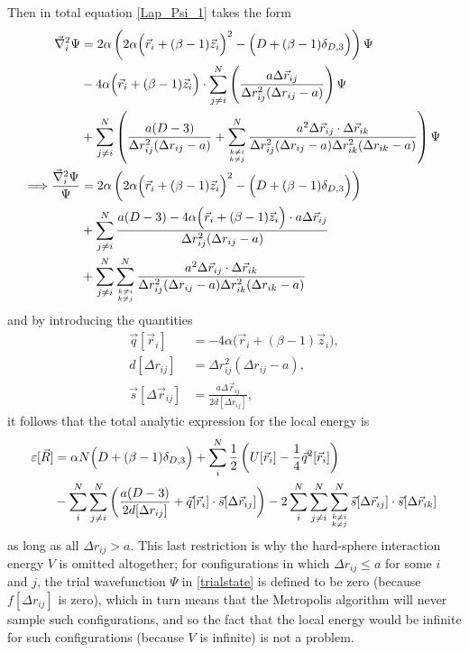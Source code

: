 \documentclass[a4paper,8pt]{article}
\begin{document}
Then in total equation \eqref{Lap_Psi_1} takes the form
\begin{align}
\vec{\nabla}_i^2\Psi &= 2\alpha\left(2\alpha\Big(\vec{r}_i+(\beta-1)\vec{z}_i\Big)^2-\Big(D+(\beta-1)\delta_{D,3}\Big)\right) \Psi \nonumber\\
&- 4\alpha\Big(\vec{r}_i+(\beta-1)\vec{z}_i\Big) \cdot \sum\limits_{j \neq i}^N \left(\frac{a\Delta\vec{r}_{ij}}{\Delta{r}_{ij}^2(\Delta{r}_{ij}-a)}\right) \Psi \nonumber\\
&+ \sum\limits_{j \neq i}^N \left(\frac{a(D-3)}{\Delta{r}_{ij}^2(\Delta{r}_{ij}-a)} + \sum\limits_{{k \neq i}\atop{k \neq j}}^N \frac{a^2 \Delta\vec{r}_{ij} \cdot \Delta\vec{r}_{ik}}{\Delta{r}_{ij}^2(\Delta{r}_{ij}-a) \Delta{r}_{ik}^2(\Delta{r}_{ik}-a)}\right) \Psi \nonumber\\
\Longrightarrow \frac{\vec{\nabla}_i^2\Psi}{\Psi} &= 2\alpha\left(2\alpha\Big(\vec{r}_i+(\beta-1)\vec{z}_i\Big)^2-\Big(D+(\beta-1)\delta_{D,3}\Big)\right) \nonumber\\
&+ \sum\limits_{j \neq i}^N \frac{a(D-3) - 4\alpha\Big(\vec{r}_i+(\beta-1)\vec{z}_i\Big) \cdot a\Delta\vec{r}_{ij}}{\Delta{r}_{ij}^2(\Delta{r}_{ij}-a)} \nonumber\\
&+ \sum\limits_{j \neq i}^N \sum\limits_{{k \neq i}\atop{k \neq j}}^N \frac{a^2 \Delta\vec{r}_{ij} \cdot \Delta\vec{r}_{ik}}{\Delta{r}_{ij}^2(\Delta{r}_{ij}-a) \Delta{r}_{ik}^2(\Delta{r}_{ik}-a)}
\end{align}
and by introducing the quantities
\begin{align}
\vec{q}[\vec{r}_i] &= -4\alpha\Big(\vec{r}_i+(\beta-1)\vec{z}_i\Big), \label{q}\\
d[\Delta{r}_{ij}] &= \Delta{r}_{ij}^2(\Delta{r}_{ij}-a), \label{d}\\
\vec{s}[\Delta\vec{r}_{ij}] &= \frac{a\Delta\vec{r}_{ij}}{2d[\Delta{r}_{ij}]}, \label{s}
\end{align}
it follows that the total analytic expression for the local energy is
\begin{align}
\varepsilon[\vec{R}] &= \alpha N\Big(D+(\beta-1)\delta_{D,3}\Big) + \sum\limits_i^N \frac{1}{2}\left( U[\vec{r}_i] - \frac{1}{4}\vec{q}^2[\vec{r}_i] \right) \nonumber\\
&- \sum\limits_i^N \sum\limits_{j \neq i}^N \left( \frac{a(D-3)}{2d[\Delta{r}_{ij}]} + \vec{q}[\vec{r}_i] \cdot \vec{s}[\Delta\vec{r}_{ij}] \right) - 2\sum\limits_i^N \sum\limits_{j \neq i}^N \sum\limits_{{k \neq i}\atop{k \neq j}}^N \vec{s}[\Delta\vec{r}_{ij}] \cdot \vec{s}[\Delta\vec{r}_{ik}]
\end{align}
as long as all $\Delta r_{ij} > a$. This last restriction is why the hard-sphere interaction energy $V$ is omitted altogether; for configurations in which $\Delta r_{ij} \leq a$ for some $i$ and $j$, the trial wavefunction $\Psi$ in \eqref{trialstate} is defined to be zero (because $f[\Delta r_{ij}]$ is zero), which in turn means that the Metropolis algorithm will never sample such configurations, and so the fact that the local energy would be infinite for such configurations (because $V$ is infinite) is not a problem.
\end{document}
